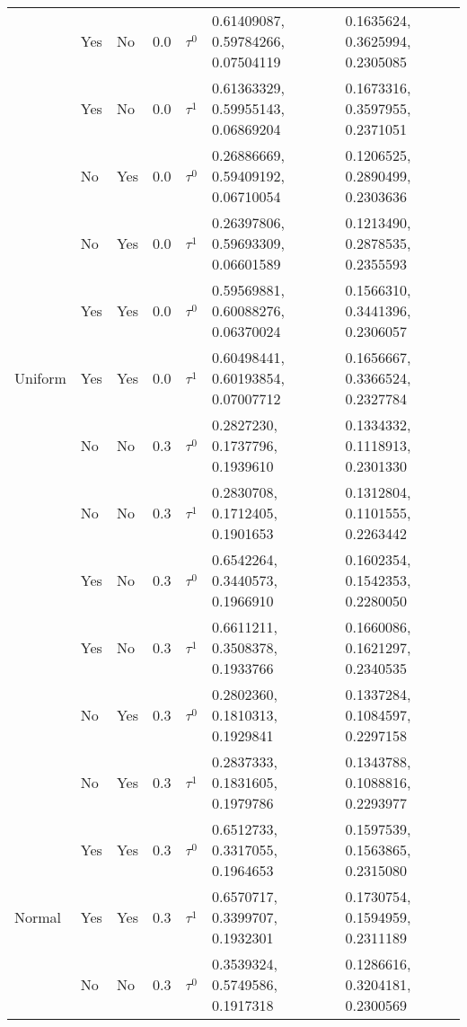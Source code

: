 \begin{tabular}[t]{lllrlll}
 & Yes & No & 0.0 & $\tau^0$ & 0.61409087, 0.59784266, 0.07504119 & 0.1635624, 0.3625994, 0.2305085\\

 & Yes & No & 0.0 & $\tau^1$ & 0.61363329, 0.59955143, 0.06869204 & 0.1673316, 0.3597955, 0.2371051\\

 & No & Yes & 0.0 & $\tau^0$ & 0.26886669, 0.59409192, 0.06710054 & 0.1206525, 0.2890499, 0.2303636\\

 & No & Yes & 0.0 & $\tau^1$ & 0.26397806, 0.59693309, 0.06601589 & 0.1213490, 0.2878535, 0.2355593\\

 & Yes & Yes & 0.0 & $\tau^0$ & 0.59569881, 0.60088276, 0.06370024 & 0.1566310, 0.3441396, 0.2306057\\

\multirow{-8}{*}{\raggedright\arraybackslash Uniform} & Yes & Yes & 0.0 & $\tau^1$ & 0.60498441, 0.60193854, 0.07007712 & 0.1656667, 0.3366524, 0.2327784\\
\cmidrule{1-7}
 & No & No & 0.3 & $\tau^0$ & 0.2827230, 0.1737796, 0.1939610 & 0.1334332, 0.1118913, 0.2301330\\

 & No & No & 0.3 & $\tau^1$ & 0.2830708, 0.1712405, 0.1901653 & 0.1312804, 0.1101555, 0.2263442\\

 & Yes & No & 0.3 & $\tau^0$ & 0.6542264, 0.3440573, 0.1966910 & 0.1602354, 0.1542353, 0.2280050\\

 & Yes & No & 0.3 & $\tau^1$ & 0.6611211, 0.3508378, 0.1933766 & 0.1660086, 0.1621297, 0.2340535\\

 & No & Yes & 0.3 & $\tau^0$ & 0.2802360, 0.1810313, 0.1929841 & 0.1337284, 0.1084597, 0.2297158\\

 & No & Yes & 0.3 & $\tau^1$ & 0.2837333, 0.1831605, 0.1979786 & 0.1343788, 0.1088816, 0.2293977\\

 & Yes & Yes & 0.3 & $\tau^0$ & 0.6512733, 0.3317055, 0.1964653 & 0.1597539, 0.1563865, 0.2315080\\

\multirow{-8}{*}{\raggedright\arraybackslash Normal} & Yes & Yes & 0.3 & $\tau^1$ & 0.6570717, 0.3399707, 0.1932301 & 0.1730754, 0.1594959, 0.2311189\\
\cmidrule{1-7}
 & No & No & 0.3 & $\tau^0$ & 0.3539324, 0.5749586, 0.1917318 & 0.1286616, 0.3204181, 0.2300569\\


\end{tabular}
